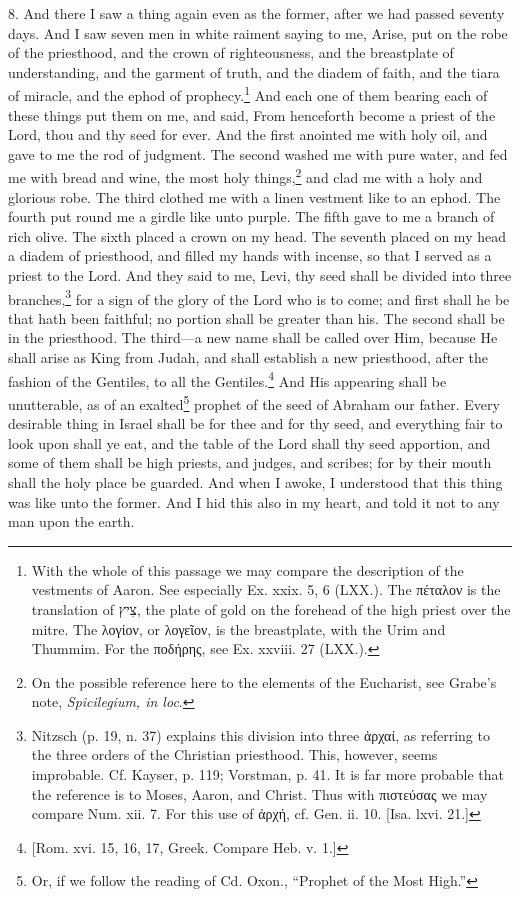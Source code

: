 8. And there I saw a thing again even as the former, after we had passed seventy days. And I saw seven men in white raiment saying to me, Arise, put on the robe of the priesthood, and the crown of righteousness, and the breastplate of understanding, and the garment of truth, and the diadem of faith, and the tiara of miracle, and the ephod of prophecy.\footnote{With the whole of this passage we may compare the description of the vestments of Aaron. See especially Ex. xxix. 5, 6 (LXX.). The \textgreek{πέταλον} is the translation of \texthebrew{צִיץ}, the plate of gold on the forehead of the high priest over the mitre. The \textgreek{λογίον}, or \textgreek{λογεῖον}, is the breastplate, with the Urim and Thummim. For the \textgreek{ποδήρης}, see Ex. xxviii. 27 (LXX.).} And each one of them bearing each of these things put them on me, and said, From henceforth become a priest of the Lord, thou and thy seed for ever. And the first anointed me with holy oil, and gave to me the rod of judgment. The second washed me with pure water, and fed me with bread and wine, the most holy things,\footnote{On the possible reference here to the elements of the Eucharist, see Grabe’s note, \emph{Spicilegium, in loc}.} and clad me with a holy and glorious robe. The third clothed me with a linen vestment like to an ephod. The fourth put round me a girdle like unto purple. The fifth gave to me a branch of rich olive. The sixth placed a crown on my head. The seventh placed on my head a diadem of priesthood, and filled my hands with incense, so that I served as a priest to the Lord. And they said to me, Levi, thy seed shall be divided into three branches,\footnote{Nitzsch (p. 19, n. 37) explains this division into three \textgreek{ἀρχαί}, as referring to the three orders of the Christian priesthood. This, however, seems improbable. Cf. Kayser, p. 119; Vorstman, p. 41. It is far more probable that the reference is to Moses, Aaron, and Christ. Thus with \textgreek{πιστεύσας} we may compare Num. xii. 7. For this use of \textgreek{ἀρχή}, cf. Gen. ii. 10. [Isa. lxvi. 21.]} for a sign of the glory of the Lord who is to come; and first shall he be that hath been faithful; no portion shall be greater than his. The second shall be in the priesthood. The third—a new name shall be called over Him, because He shall arise as King from Judah, and shall establish a new priesthood, after the fashion of the Gentiles, to all the Gentiles.\footnote{[Rom. xvi. 15, 16, 17, Greek. Compare Heb. v. 1.]} And His appearing shall be unutterable, as of an exalted\footnote{Or, if we follow the reading of Cd. Oxon., “Prophet of the Most High.”} prophet of the seed of Abraham our father. Every desirable thing in Israel shall be for thee and for thy seed, and everything fair to look upon shall ye eat, and the table of the Lord shall thy seed apportion, and some of them shall be high priests, and judges, and scribes; for by their mouth shall the holy place be guarded. And when I awoke, I understood that this thing was like unto the former. And I hid this also in my heart, and told it not to any man upon the earth.

